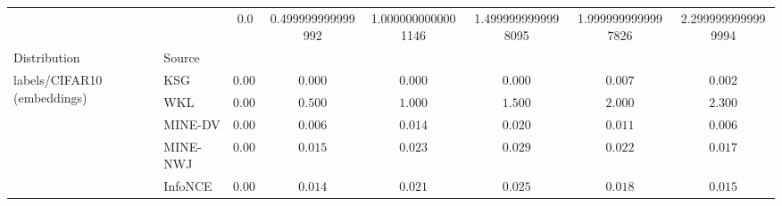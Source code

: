 \begin{tabular}{llcccccc}
\toprule
 &  & 0.0 & 0.499999999999992 & 1.0000000000001146 & 1.4999999999998095 & 1.9999999999997826 & 2.2999999999999994 \\
Distribution & Source &  &  &  &  &  &  \\
\midrule
\multirow[l]{5}{*}{labels/CIFAR10 (embeddings)} & KSG & $ 0.000 $ & $ 0.000 $ & $ 0.000 $ & $ 0.000 $ & $ 0.007 $ & $ 0.002 $ \\
 & WKL & $ 0.000 $ & $ 0.500 $ & $ 1.000 $ & $ 1.500 $ & $ 2.000 $ & $ 2.300 $ \\
 & MINE-DV & $ 0.000 $ & $ 0.006 $ & $ 0.014 $ & $ 0.020 $ & $ 0.011 $ & $ 0.006 $ \\
 & MINE-NWJ & $ 0.000 $ & $ 0.015 $ & $ 0.023 $ & $ 0.029 $ & $ 0.022 $ & $ 0.017 $ \\
 & InfoNCE & $ 0.000 $ & $ 0.014 $ & $ 0.021 $ & $ 0.025 $ & $ 0.018 $ & $ 0.015 $ \\
\bottomrule
\end{tabular}
